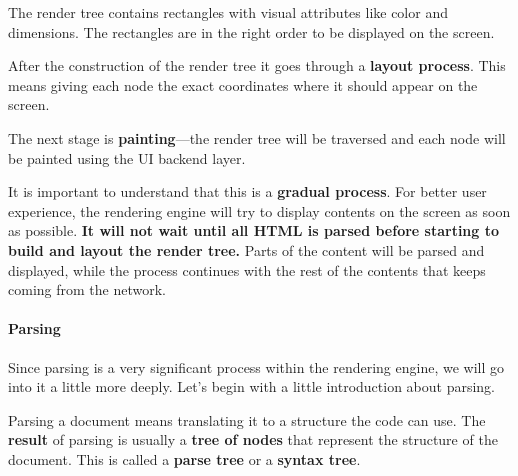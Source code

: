 \documentclass[a4paper, justified, notoc]{tufte-handout} %
\begin{document}
The render tree contains rectangles with visual attributes like color and dimensions. The rectangles are in the right order to be displayed on the screen.

After the construction of the render tree it goes through a \textbf{layout process}. This means giving each node the exact coordinates where it should appear on the screen. 

The next stage is \textbf{painting}---the render tree will be traversed and each node will be painted using the UI backend layer.

It is important to understand that this is a \textbf{gradual process}. For better user experience, the rendering engine will try to display contents on the screen as soon as possible. \textbf{It will not wait until all HTML is parsed before starting to build and layout the render tree.} Parts of the content will be parsed and displayed, while the process continues with the rest of the contents that keeps coming from the network.

\paragraph{Parsing} %
\label{par:parsing}
Since parsing is a very significant process within the rendering engine, we will go into it a little more deeply. Let's begin with a little introduction about parsing.

Parsing a document means translating it to a structure the code can use. The \textbf{result} of parsing is usually a \textbf{tree of nodes} that represent the structure of the document. This is called a \textbf{parse tree} or a \textbf{syntax tree}.
\end{document}
